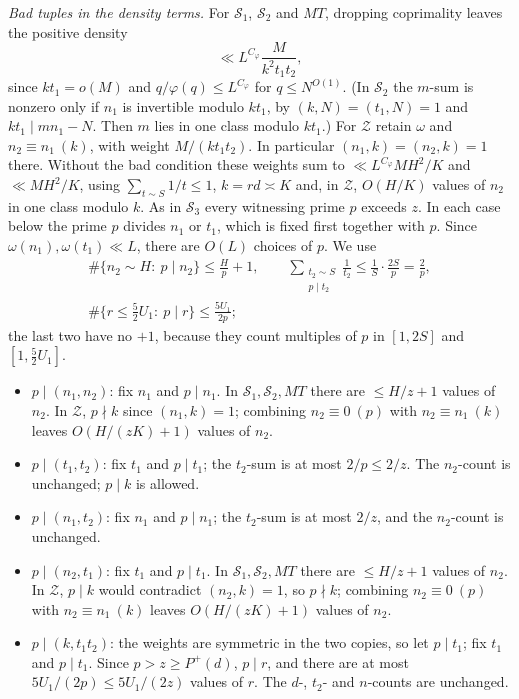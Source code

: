 \emph{Bad tuples in the density terms.} For $\mathcal S_1$, $\mathcal S_2$ and
$MT$, dropping coprimality leaves the positive density
\[
 \ll L^{C_\varphi}\frac M{k^2t_1t_2},
\]
since $kt_1=o(M)$ and $q/\varphi(q)\le L^{C_\varphi}$ for $q\le N^{O(1)}$. (In
$\mathcal S_2$ the $m$-sum is nonzero only if $n_1$ is invertible modulo
$kt_1$, by $(k,N)=(t_1,N)=1$ and $kt_1\mid mn_1-N$. Then $m$ lies in one
class modulo $kt_1$.) For $\mathcal Z$ retain $\omega$ and
$n_2\equiv n_1\ (k)$, with weight $M/(kt_1t_2)$. In particular
$(n_1,k)=(n_2,k)=1$ there. Without the bad condition these weights sum to
$\ll L^{C_\varphi}MH^2/K$ and $\ll MH^2/K$, using $\sum_{t\sim S}1/t\le1$,
$k=rd\asymp K$ and, in $\mathcal Z$, $O(H/K)$ values of $n_2$ in one class
modulo $k$. As in $\mathcal S_3$ every witnessing prime $p$ exceeds $z$. In
each case below the prime $p$ divides $n_1$ or $t_1$, which is fixed first
together with $p$. Since $\omega(n_1),\omega(t_1)\ll L$, there are $O(L)$
choices of $p$. We use
\[
\begin{gathered}
 \#\{n_2\sim H:\ p\mid n_2\}\le\frac Hp+1,\qquad
 \sum_{\substack{t_2\sim S\\p\mid t_2}}\frac1{t_2}\le\frac1S\cdot\frac{2S}p=\frac2p,\\
 \#\{r\le\tfrac52U_1:\ p\mid r\}\le\frac{5U_1}{2p};
\end{gathered}
\]
the last two have no $+1$, because they count multiples of $p$ in
$[1,2S]$ and $[1,\frac52U_1]$.
\begin{itemize}
 \item $p\mid(n_1,n_2)$: fix $n_1$ and $p\mid n_1$. In $\mathcal S_1,\mathcal S_2,MT$
 there are $\le H/z+1$ values of $n_2$. In $\mathcal Z$, $p\nmid k$ since
 $(n_1,k)=1$; combining $n_2\equiv0\ (p)$ with $n_2\equiv n_1\ (k)$ leaves
 $O(H/(zK)+1)$ values of $n_2$.
 \item $p\mid(t_1,t_2)$: fix $t_1$ and $p\mid t_1$; the $t_2$-sum is at most
 $2/p\le2/z$. The $n_2$-count is unchanged; $p\mid k$ is allowed.
 \item $p\mid(n_1,t_2)$: fix $n_1$ and $p\mid n_1$; the $t_2$-sum is at most
 $2/z$, and the $n_2$-count is unchanged.
 \item $p\mid(n_2,t_1)$: fix $t_1$ and $p\mid t_1$. In $\mathcal S_1,\mathcal S_2,MT$
 there are $\le H/z+1$ values of $n_2$. In $\mathcal Z$, $p\mid k$ would
 contradict $(n_2,k)=1$, so $p\nmid k$; combining $n_2\equiv0\ (p)$ with
 $n_2\equiv n_1\ (k)$ leaves $O(H/(zK)+1)$ values of $n_2$.
 \item $p\mid(k,t_1t_2)$: the weights are symmetric in the two copies, so let
 $p\mid t_1$; fix $t_1$ and $p\mid t_1$. Since $p>z\ge P^+(d)$, $p\mid r$, and
 there are at most $5U_1/(2p)\le5U_1/(2z)$ values of $r$. The $d$-, $t_2$-
 and $n$-counts are unchanged.
\end{itemize}
